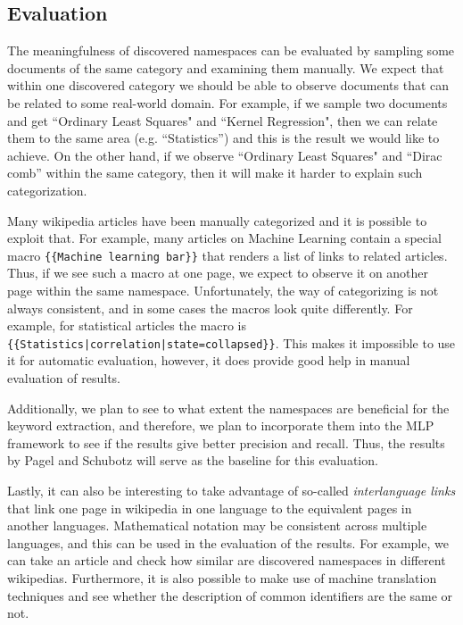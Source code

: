 
\subsection{Evaluation}


The meaningfulness of discovered namespaces can be evaluated by sampling some documents of the same category and examining them manually. We expect that within one discovered category we should be able to observe documents that can be related to some real-world domain. For example, if we sample two documents and get ``Ordinary Least Squares" and ``Kernel Regression", then we can relate them to the same area (e.g. ``Statistics'') and this is the result we would like to achieve. On the other hand, if we observe ``Ordinary Least Squares" and ``Dirac comb'' within the same category, then it will make it harder to explain such categorization.

Many wikipedia articles have been manually categorized and it is possible to exploit that. For example, many articles on Machine Learning contain a special macro \texttt{\{\{Machine learning bar\}\}} that renders a list of links to related articles. Thus, if we see such a macro at one page, we expect to observe it on another page within the same namespace. Unfortunately, the way of categorizing is not always consistent, and in some cases the macros look quite differently. For example, for statistical articles the macro is \texttt{\{\{Statistics|correlation|state=collapsed\}\}}. This makes it impossible to use it for automatic evaluation, however, it does provide good help in manual evaluation of results.


Additionally, we plan to see to what extent the namespaces are beneficial for the keyword extraction, and therefore, we plan to incorporate them into the MLP framework \cite{pagael2014mlp} to see if the results give better precision and recall. Thus, the results by Pagel and Schubotz \cite{pagael2014mlp} will serve as the baseline for this evaluation.


Lastly, it can also be interesting to take advantage of so-called \emph{interlanguage links} that link one page in wikipedia in one language to the equivalent pages in another languages. Mathematical notation may be consistent across multiple languages, and this can be used in the evaluation of the results. For example, we can take an article and check how similar are discovered namespaces in different wikipedias. Furthermore, it is also possible to make use of machine translation techniques and see whether the description of common identifiers are the same or not.
